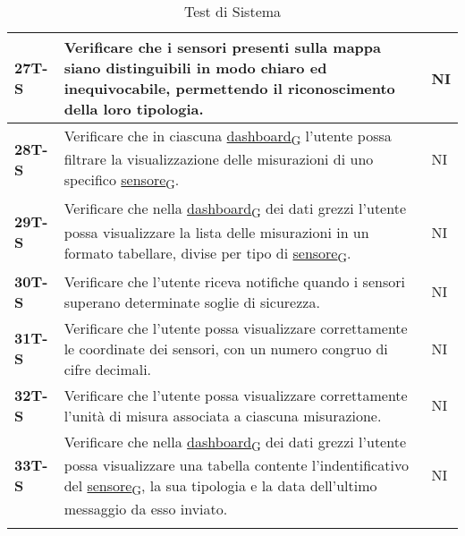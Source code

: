 \begin{longtable}{|>{\raggedright\arraybackslash}m{}|>{\raggedright\arraybackslash}m{}|>{\raggedright\arraybackslash}m{}|}
	\hline
	\textbf{27T-S}  & Verificare che i sensori presenti sulla mappa siano distinguibili in modo chiaro ed inequivocabile, permettendo il riconoscimento della loro tipologia.                                          & NI             \\
	\hline
	\textbf{28T-S}  & Verificare che in ciascuna \href{https://7last.github.io/docs/rtb/documentazione-interna/glossario\#dashboard}{dashboard\textsubscript{G}} l’utente possa filtrare la visualizzazione delle misurazioni di uno specifico \href{https://7last.github.io/docs/rtb/documentazione-interna/glossario\#sensore}{sensore\textsubscript{G}}.                                                                      & NI             \\
	\hline
	\textbf{29T-S}  & Verificare che nella \href{https://7last.github.io/docs/rtb/documentazione-interna/glossario\#dashboard}{dashboard\textsubscript{G}} dei dati grezzi l’utente possa visualizzare la lista delle misurazioni in un formato tabellare, divise per tipo di \href{https://7last.github.io/docs/rtb/documentazione-interna/glossario\#sensore}{sensore\textsubscript{G}}.                                       & NI             \\ %
	\hline
	\textbf{30T-S}  & Verificare che l’utente riceva notifiche quando i sensori superano determinate soglie di sicurezza.                                                                                          & NI             \\
	\hline
	\textbf{31T-S}  & Verificare che l’utente possa visualizzare correttamente le coordinate dei sensori, con un numero congruo di cifre decimali.                                                                     & NI             \\
	\hline
	\textbf{32T-S}  & Verificare che l’utente possa visualizzare correttamente l’unità di misura associata a ciascuna misurazione.                                                                                     & NI             \\
	\hline
	\textbf{33T-S}  & Verificare che nella \href{https://7last.github.io/docs/rtb/documentazione-interna/glossario\#dashboard}{dashboard\textsubscript{G}} dei dati grezzi l'utente possa visualizzare una tabella contente l'indentificativo del \href{https://7last.github.io/docs/rtb/documentazione-interna/glossario\#sensore}{sensore\textsubscript{G}}, la sua tipologia e la data dell'ultimo messaggio da esso inviato. & NI             \\
	\hline
	\caption{Test di Sistema}
\end{longtable}

